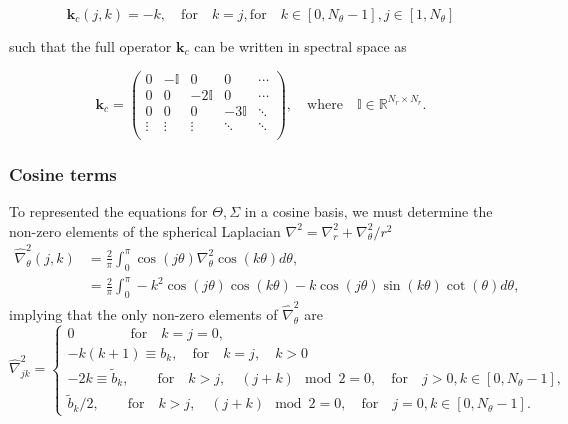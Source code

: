 \documentclass[a4paper]{article}
\begin{document}
\begin{equation}
\boldsymbol{k}_{c}(j,k) = - k, \quad \text{for} \quad k = j, \text{for} \quad k \in [0,N_{\theta}-1],  j \in [1,N_{\theta}]
\end{equation}

\noindent such that the full operator $\boldsymbol{k}_{c}$ can be written in spectral space as

\begin{equation}
\boldsymbol{k}_{c} =
\begin{pmatrix}
0 & -\mathbb{I} & 0 & 0 &\cdots \\
0 & 0 & -2\mathbb{I} & 0 & \cdots \\
0 & 0 & 0 & -3\mathbb{I} & \ddots \\
\vdots & \vdots & \vdots & \ddots & \ddots \\
\end{pmatrix}, \quad
\text{where} \quad \mathbb{I} \in \mathbb{R}^{N_r \times N_r}.
\label{eq:G_THETA}
\end{equation}

\subsubsection{Cosine terms}

\noindent To represented the equations for $\Theta,\Sigma$ in a cosine basis, we must determine the non-zero elements of the spherical Laplacian $\nabla^2 = \nabla^2_r + \nabla^2_{\theta}/r^2$
\begin{align*}
    \hat{\nabla}^2_{\theta}(j,k) &= \frac{2}{\pi} \int^{\pi}_{0} \cos(j \theta) \nabla^2_{\theta} \cos(k \theta) d \theta, \\
    &= \frac{2}{\pi} \int^{\pi}_{0} -k^2 \cos(j \theta) \cos(k \theta) - k \cos (j \theta) \sin(k \theta) \cot( \theta) d \theta,
\end{align*}
\noindent implying that the only non-zero elements of $\hat{\nabla}^2_{\theta}$ are 
\begin{equation}
\hat{\nabla}^2_{jk} = 
\begin{cases}
0 \quad\quad\quad\quad \text{for} \quad k = j = 0,  \\
-k(k + 1) \equiv b_k, \quad \text{for} \quad k = j, \quad k > 0  \\
-2k \equiv \tilde{b}_k, \quad\quad \text{for} \quad k > j, \quad (j+k) \mod 2 = 0, \quad \text{for} \quad j>0,k \in [0,N_{\theta}-1], \\
\tilde{b}_k/2, \quad\quad \text{for} \quad k > j, \quad (j+k) \mod 2 = 0, \quad \text{for} \quad j=0,k \in [0,N_{\theta}-1].
\end{cases}
\end{equation}
\end{document}
